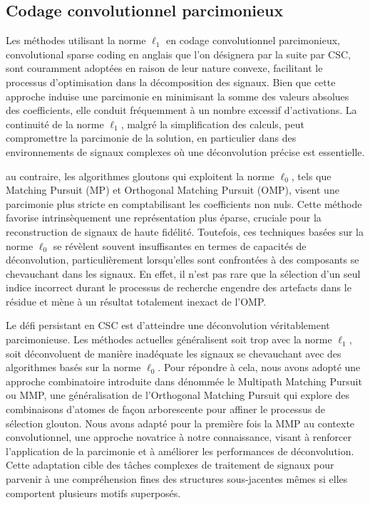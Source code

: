 \documentclass[9pt,a4paper,twoside]{rho}
\begin{document}
\subsection{Codage convolutionnel parcimonieux}

Les méthodes utilisant la norme $\ell_1$ en codage convolutionnel parcimonieux, convolutional sparse coding en anglais que l'on désignera par la suite par CSC, sont couramment adoptées en raison de leur nature convexe, facilitant le processus d'optimisation dans la décomposition des signaux.
Bien que cette approche induise une parcimonie en minimisant la somme des valeurs absolues des coefficients, elle conduit fréquemment à un nombre excessif d'activations.
La continuité de la norme $\ell_1$, malgré la simplification des calculs, peut compromettre la parcimonie de la solution, en particulier dans des environnements de signaux complexes où une déconvolution précise est essentielle. 

au contraire, les algorithmes gloutons qui exploitent la norme $\ell_0$, tels que Matching Pursuit (MP) et Orthogonal Matching Pursuit (OMP), visent une parcimonie plus stricte en comptabilisant les coefficients non nuls. 
Cette méthode favorise intrinsèquement une représentation plus éparse, cruciale pour la reconstruction de signaux de haute fidélité.
Toutefois, ces techniques basées sur la norme $\ell_0$ se révèlent souvent insuffisantes en termes de capacités de déconvolution, particulièrement lorsqu'elles sont confrontées à des composants se chevauchant dans les signaux. 
En effet, il n'est pas rare que la sélection d'un seul indice incorrect durant le processus de recherche engendre des artefacts dans le résidue et mène à un résultat totalement inexact de l'OMP. 

Le défi persistant en CSC est d'atteindre une déconvolution véritablement parcimonieuse.
Les méthodes actuelles généralisent soit trop avec la norme $\ell_1$, soit déconvoluent de manière inadéquate les signaux se chevauchant avec des algorithmes basés sur la norme $\ell_0$. 
Pour répondre à cela, nous avons adopté une approche combinatoire introduite dans \cite{multipath_matching_pursuit} dénommée le Multipath Matching Pursuit ou MMP, une généralisation de l'Orthogonal Matching Pursuit qui explore des combinaisons d'atomes de façon arborescente pour affiner le processus de sélection glouton. 
Nous avons adapté pour la première fois la MMP au contexte convolutionnel, une approche novatrice à notre connaissance, visant à renforcer l'application de la parcimonie et à améliorer les performances de déconvolution. 
Cette adaptation cible des tâches complexes de traitement de signaux pour parvenir à une compréhension fines des structures sous-jacentes mêmes si elles comportent plusieurs motifs superposés.
\end{document}
